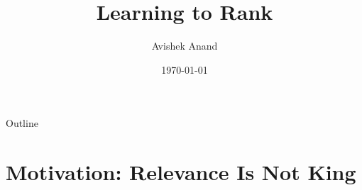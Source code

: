 \documentclass[aspectratio=169]{beamer}
\title{Learning to Rank}
\author{Avishek Anand}
\institute{Information Retrieval}
\date{\today}
\begin{document}
\begin{frame}[plain]
\titlepage
\end{frame}

\begin{frame}{Outline}
\tableofcontents
\end{frame}




\section{Motivation: Relevance Is Not King}
\end{document}
